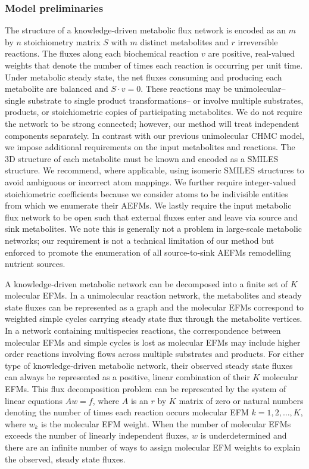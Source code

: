 \documentclass[12pt]{article}
\begin{document}
\subsubsection*{Model preliminaries}

The structure of a knowledge-driven metabolic flux network is encoded as
an $m$ by $n$ stoichiometry matrix $S$ with $m$ distinct metabolites and
$r$ irreversible reactions. The fluxes along each biochemical reaction $v$ are
positive, real-valued weights that denote the number of times each
reaction is occurring per unit time. Under metabolic steady state, the net
fluxes consuming and producing each metabolite are balanced and $S \cdot
v = 0$. These reactions may be unimolecular--single substrate to single
product transformations-- or involve multiple substrates, products, or
stoichiometric copies of participating metabolites. We do not require the
network to be strong connected; however, our method will treat independent
components separately. In contrast with our previous unimolecular CHMC
model, we impose additional requirements on the input metabolites and
reactions. The 3D structure of each metabolite must be known and encoded
as a SMILES structure. We recommend, where applicable, using isomeric
SMILES structures to avoid ambiguous or incorrect atom mappings. We
further require integer-valued stoichiometric coefficients because we
consider atoms to be indivisible entities from which we enumerate their
AEFMs. We lastly require the input metabolic flux network to be open such
that external fluxes enter and leave via source and sink metabolites. We
note this is generally not a problem in large-scale metabolic networks;
our requirement is not a technical limitation of our method but enforced
to promote the enumeration of all source-to-sink AEFMs remodelling
nutrient sources.


A knowledge-driven metabolic network can be decomposed into a finite set
of $K$ molecular EFMs. In a unimolecular reaction network, the metabolites
and steady state fluxes can be represented as a graph and the molecular
EFMs correspond to weighted simple cycles carrying steady state flux
through the metabolite vertices. In a network containing multispecies
reactions, the correspondence between molecular EFMs and simple cycles is
lost as molecular EFMs may include higher order reactions involving flows
across multiple substrates and products. For either type of
knowledge-driven metabolic network, their observed steady state fluxes can
always be represented as a positive, linear combination of their $K$
molecular EFMs. This flux decomposition problem can be represented by the
system of linear equations $Aw = f$, where $A$ is an $r$ by $K$ matrix of
zero or natural numbers denoting the number of times each reaction occurs
molecular EFM $k=1,2,\ldots,K$, where $w_k$ is the molecular EFM weight.
When the number of molecular EFMs exceeds the number of linearly
independent fluxes, $w$ is underdetermined and there are an infinite
number of ways to assign molecular EFM weights to explain the observed,
steady state fluxes.
\end{document}
